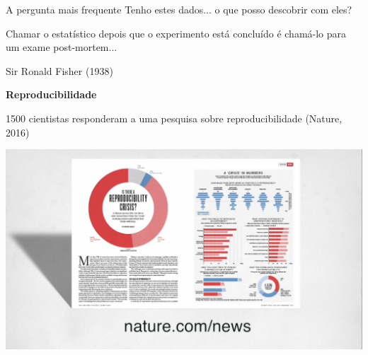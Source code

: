 \documentclass{beamer}
\begin{document}
\begin{frame}
  \begin{block}{A pergunta mais frequente}
    Tenho estes dados... o que posso descobrir com eles?
  \end{block}
\end{frame}

\begin{frame}
  \begin{block}{}
    Chamar o estatístico depois que o experimento está concluído é chamá-lo para um exame post-mortem...

\bigskip
{}
  \end{block}
\hfill Sir Ronald Fisher (1938)
\end{frame}

\begin{frame}
  \begin{center}
    {\bf Reproducibilidade}
  \end{center}
\end{frame}

\begin{frame}
  1500 cientistas responderam a uma pesquisa sobre reproducibilidade (Nature, 2016)

\includegraphics[width=\textwidth]{Imagens/reprod-nature3}
\end{frame}
\end{document}
